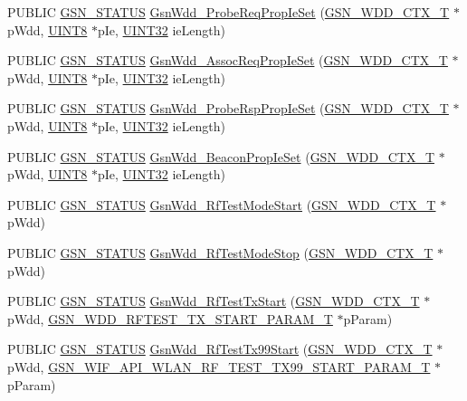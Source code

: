 \begin{DoxyCompactItemize}
\item 
PUBLIC \hyperlink{a00660_gada5951904ac6110b1fa95e51a9ddc217}{GSN\_\-STATUS} \hyperlink{a00603_aa41cf4f9ed094cdaf34743aab0f18d66}{GsnWdd\_\-ProbeReqPropIeSet} (\hyperlink{a00108}{GSN\_\-WDD\_\-CTX\_\-T} $\ast$pWdd, \hyperlink{a00660_gab27e9918b538ce9d8ca692479b375b6a}{UINT8} $\ast$pIe, \hyperlink{a00660_gae1e6edbbc26d6fbc71a90190d0266018}{UINT32} ieLength)
\item 
PUBLIC \hyperlink{a00660_gada5951904ac6110b1fa95e51a9ddc217}{GSN\_\-STATUS} \hyperlink{a00603_ae6ad3555ec44c34eeed404750e7942b4}{GsnWdd\_\-AssocReqPropIeSet} (\hyperlink{a00108}{GSN\_\-WDD\_\-CTX\_\-T} $\ast$pWdd, \hyperlink{a00660_gab27e9918b538ce9d8ca692479b375b6a}{UINT8} $\ast$pIe, \hyperlink{a00660_gae1e6edbbc26d6fbc71a90190d0266018}{UINT32} ieLength)
\item 
PUBLIC \hyperlink{a00660_gada5951904ac6110b1fa95e51a9ddc217}{GSN\_\-STATUS} \hyperlink{a00603_ab42f3a4a349c23b656836cc286cef669}{GsnWdd\_\-ProbeRspPropIeSet} (\hyperlink{a00108}{GSN\_\-WDD\_\-CTX\_\-T} $\ast$pWdd, \hyperlink{a00660_gab27e9918b538ce9d8ca692479b375b6a}{UINT8} $\ast$pIe, \hyperlink{a00660_gae1e6edbbc26d6fbc71a90190d0266018}{UINT32} ieLength)
\item 
PUBLIC \hyperlink{a00660_gada5951904ac6110b1fa95e51a9ddc217}{GSN\_\-STATUS} \hyperlink{a00603_a69b2499f175b750a525e64f76836ad25}{GsnWdd\_\-BeaconPropIeSet} (\hyperlink{a00108}{GSN\_\-WDD\_\-CTX\_\-T} $\ast$pWdd, \hyperlink{a00660_gab27e9918b538ce9d8ca692479b375b6a}{UINT8} $\ast$pIe, \hyperlink{a00660_gae1e6edbbc26d6fbc71a90190d0266018}{UINT32} ieLength)
\item 
PUBLIC \hyperlink{a00660_gada5951904ac6110b1fa95e51a9ddc217}{GSN\_\-STATUS} \hyperlink{a00603_a9ee9b45c0ef30ed06c686dcb774b4b6f}{GsnWdd\_\-RfTestModeStart} (\hyperlink{a00108}{GSN\_\-WDD\_\-CTX\_\-T} $\ast$pWdd)
\item 
PUBLIC \hyperlink{a00660_gada5951904ac6110b1fa95e51a9ddc217}{GSN\_\-STATUS} \hyperlink{a00603_a08170266b4cc58f85de91e014d9037fa}{GsnWdd\_\-RfTestModeStop} (\hyperlink{a00108}{GSN\_\-WDD\_\-CTX\_\-T} $\ast$pWdd)
\item 
PUBLIC \hyperlink{a00660_gada5951904ac6110b1fa95e51a9ddc217}{GSN\_\-STATUS} \hyperlink{a00603_a61acb98a54929d589e2b51099ee59bd6}{GsnWdd\_\-RfTestTxStart} (\hyperlink{a00108}{GSN\_\-WDD\_\-CTX\_\-T} $\ast$pWdd, \hyperlink{a00187}{GSN\_\-WDD\_\-RFTEST\_\-TX\_\-START\_\-PARAM\_\-T} $\ast$pParam)
\item 
PUBLIC \hyperlink{a00660_gada5951904ac6110b1fa95e51a9ddc217}{GSN\_\-STATUS} \hyperlink{a00603_a3ee4d6fc6b1bdf8bf44efdc357a8c3bf}{GsnWdd\_\-RfTestTx99Start} (\hyperlink{a00108}{GSN\_\-WDD\_\-CTX\_\-T} $\ast$pWdd, \hyperlink{a00190}{GSN\_\-WIF\_\-API\_\-WLAN\_\-RF\_\-TEST\_\-TX99\_\-START\_\-PARAM\_\-T} $\ast$pParam)

\end{DoxyCompactItemize}
